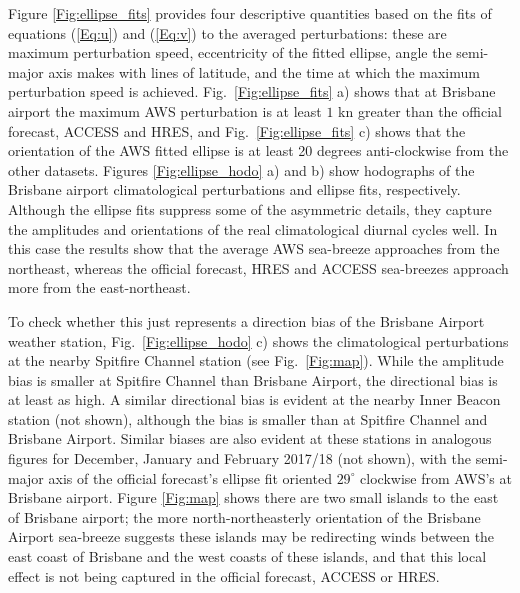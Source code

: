 \documentclass[twocol]{ametsoc}
\begin{document}
Figure \ref{Fig:ellipse_fits} provides four descriptive quantities based on the fits of equations (\ref{Eq:u}) and (\ref{Eq:v}) to the averaged perturbations: these are maximum perturbation speed, eccentricity of the fitted ellipse, angle the semi-major axis makes with lines of latitude, and the time at which the maximum perturbation speed is achieved. Fig.~\ref{Fig:ellipse_fits} a) shows that at Brisbane airport the maximum AWS perturbation is at least $1$ kn greater than the official forecast, ACCESS and HRES, and Fig.~\ref{Fig:ellipse_fits} c) shows that the orientation of the AWS fitted ellipse is at least 20 degrees anti-clockwise from the other datasets. Figures \ref{Fig:ellipse_hodo} a) and b) show hodographs of the Brisbane airport climatological perturbations and ellipse fits, respectively. Although the ellipse fits suppress some of the asymmetric details, they capture the amplitudes and orientations of the real climatological diurnal cycles well. In this case the results show that the average AWS sea-breeze approaches from the northeast, whereas the official forecast, HRES and ACCESS sea-breezes approach more from the east-northeast. 

To check whether this just represents a direction bias of the Brisbane Airport weather station, Fig.~\ref{Fig:ellipse_hodo} c) shows the climatological perturbations at the nearby Spitfire Channel station (see Fig.~\ref{Fig:map}). While the amplitude bias is smaller at Spitfire Channel than Brisbane Airport, the directional bias is at least as high. A similar directional bias is evident at the nearby Inner Beacon station (not shown), although the bias is smaller than at Spitfire Channel and Brisbane Airport. Similar biases are also evident at these stations in analogous figures for December, January and February 2017/18 (not shown), with the semi-major axis of the official forecast's ellipse fit oriented $29^\circ$ clockwise from AWS's at Brisbane airport. Figure \ref{Fig:map} shows there are two small islands to the east of Brisbane airport; the more north-northeasterly orientation of the Brisbane Airport sea-breeze suggests these islands may be redirecting winds between the east coast of Brisbane and the west coasts of these islands, and that this local effect is not being captured in the official forecast, ACCESS or HRES. 
\end{document}

